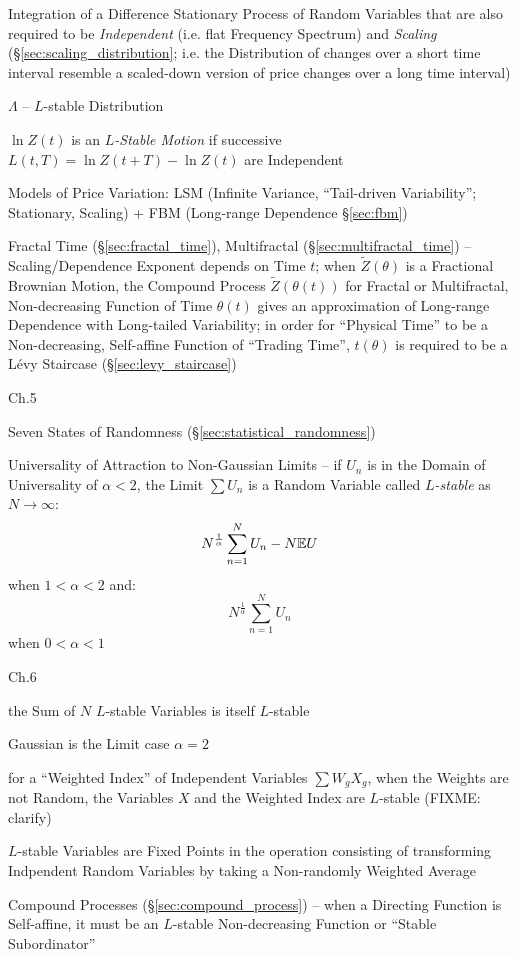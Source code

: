 Integration of a Difference Stationary Process of Random Variables that are
also required to be \emph{Independent} (i.e. flat Frequency Spectrum) and
\emph{Scaling} (\S\ref{sec:scaling_distribution}; i.e. the Distribution of
changes over a short time interval resemble a scaled-down version of price
changes over a long time interval)

$\Lambda$ -- $L$-stable Distribution

$\ln Z(t)$ is an \emph{$L$-Stable Motion} if successive
$L(t, T) = \ln Z(t + T) - \ln Z(t)$ are Independent

Models of Price Variation: LSM (Infinite Variance, ``Tail-driven Variability'';
Stationary, Scaling) + FBM (Long-range Dependence \S\ref{sec:fbm})

\fist Fractal Time (\S\ref{sec:fractal_time}), Multifractal
(\S\ref{sec:multifractal_time}) -- Scaling/Dependence Exponent depends on Time
$t$; when $\tilde{Z}(\theta)$ is a Fractional Brownian Motion, the Compound
Process $\tilde{Z}(\theta(t))$ for Fractal or Multifractal, Non-decreasing
Function of Time $\theta(t)$ gives an approximation of Long-range Dependence
with Long-tailed Variability; in order for ``Physical Time'' to be a
Non-decreasing, Self-affine Function of ``Trading Time'', $t(\theta)$ is
required to be a L\'evy Staircase (\S\ref{sec:levy_staircase})

Ch.5

\fist Seven States of Randomness (\S\ref{sec:statistical_randomness})

Universality of Attraction to Non-Gaussian Limits -- if $U_n$ is in the Domain
of Universality of $\alpha < 2$, the Limit $\sum U_n$ is a Random Variable
called \emph{$L$-stable} as $N \to \infty$:
\[
  N^\frac{1}{\alpha} \sum_{n=1}^N U_n - N \mathbb{E}{U}
\]
when $1 < \alpha < 2$ and:
\[
  N^\frac{1}{\alpha} \sum_{n=1}^N U_n
\]
when $0 < \alpha < 1$

Ch.6

the Sum of $N$ $L$-stable Variables is itself $L$-stable

Gaussian is the Limit case $\alpha = 2$

for a ``Weighted Index'' of Independent Variables $\sum W_g X_g$, when the
Weights are not Random, the Variables $X$ and the Weighted Index are $L$-stable
(FIXME: clarify)

$L$-stable Variables are Fixed Points in the operation consisting of
transforming Indpendent Random Variables by taking a Non-randomly Weighted
Average

Compound Processes (\S\ref{sec:compound_process}) -- when a Directing Function
is Self-affine, it must be an $L$-stable Non-decreasing Function or ``Stable
Subordinator''

